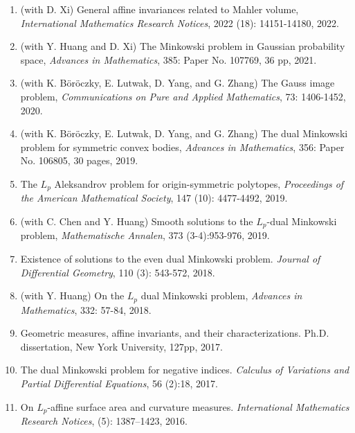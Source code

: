 \documentclass[12pt]{article}
\theoremstyle{plain} \numberwithin{equation}{section}
\theoremstyle{definition}
\begin{document}
\begin{enumerate}
\item (with D. Xi) General affine invariances related to Mahler volume, \textit{International Mathematics Research Notices}, 2022 (18): 14151-14180, 2022.
\item (with Y. Huang and D. Xi) The Minkowski problem in Gaussian probability space, \textit{Advances in Mathematics}, 385: Paper No. 107769, 36 pp, 2021.
\item (with K. B\"{o}r\"{o}czky, E. Lutwak, D. Yang, and G. Zhang) The Gauss image problem, \textit{Communications on Pure and Applied Mathematics}, 73: 1406-1452, 2020.
\item (with K. B\"{o}r\"{o}czky, E. Lutwak, D. Yang, and G. Zhang) The dual Minkowski problem for symmetric convex bodies, \textit{Advances in Mathematics}, 356: Paper No. 106805, 30 pages, 2019.
\item The $L_p$ Aleksandrov problem for origin-symmetric polytopes, \textit{Proceedings of the American Mathematical Society}, 147 (10): 4477-4492, 2019.
\item (with C. Chen and Y. Huang) Smooth solutions to the $L_p$-dual Minkowski problem, \textit{Mathematische Annalen}, 373 (3-4):953-976, 2019.


\item Existence of solutions to the even dual Minkowski problem. \textit{Journal of Differential Geometry}, 110 (3): 543-572, 2018.

\item (with Y. Huang) On the $L_p$ dual Minkowski problem, \textit{Advances in Mathematics}, 332: 57-84, 2018.

\item Geometric measures, affine invariants, and their characterizations. Ph.D. dissertation, New York University, 127pp, 2017.

\item The dual {M}inkowski problem for negative indices. \textit{Calculus of Variations and Partial Differential Equations}, 56 (2):18, 2017.

\item On {$L_p$}-affine surface area and curvature measures. \textit{International Mathematics Research Notices}, (5): 1387--1423, 2016.

\end{enumerate}
\end{document}
